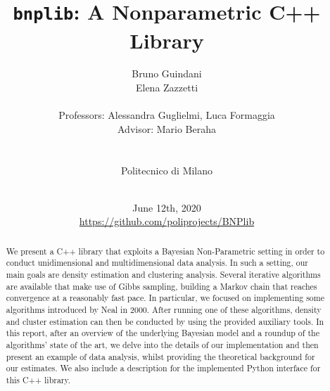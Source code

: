 \documentclass[a4paper]{report}
\title{\texttt{bnplib}: A Nonparametric C++ Library}
\author{
Bruno Guindani \\
Elena Zazzetti \\
\\
Professors: Alessandra Guglielmi, Luca Formaggia \\
Advisor: Mario Beraha \\
\\
\\
Politecnico di Milano \\
\\
}
\date{
June 12th, 2020
\\[250pt]
{\color{gray} {\url{https://github.com/poliprojects/BNPlib}}}
}
\begin{document}
\maketitle

\newpage\phantom{a}

\thispagestyle{empty}
\begin{abstract}
We present a C++ library that exploits a Bayesian Non-Parametric setting in order to conduct unidimensional and multidimensional data analysis.
In such a setting, our main goals are density estimation and clustering analysis.
Several iterative algorithms are available that make use of Gibbs sampling, building a Markov chain that reaches convergence at a reasonably fast pace.
In particular, we focused on implementing some algorithms introduced by Neal in 2000.
After running one of these algorithms, density and cluster estimation can then be conducted by using the provided auxiliary tools.
In this report, after an overview of the underlying Bayesian model and a roundup of the algorithms' state of the art, we delve into the details of our implementation and then present an example of data analysis, whilst providing the theoretical background for our estimates.
We also include a description for the implemented Python interface for this C++ library.
\end{abstract}
\setcounter{page}{4}

\tableofcontents











\end{document}
